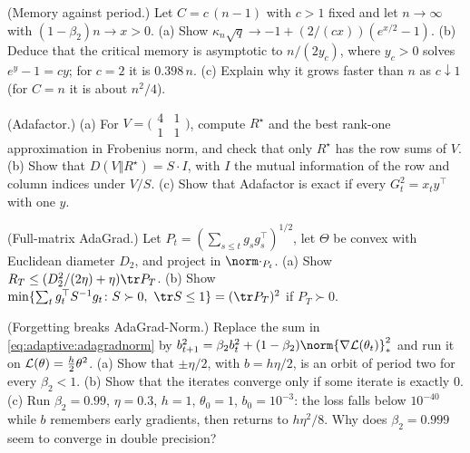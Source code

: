 \begin{refsection}
\begin{exercises}
\item \consolidation\hard (Memory against period.) Let $C=c\,(n-1)$ with $c>1$ fixed and let $n\to\infty$ with $(1-\beta_2)n\to x>0$. (a) Show $\kappa_n\sqrt q\to-1+(2/(cx))(e^{x/2}-1)$. (b) Deduce that the critical memory is asymptotic to $n/(2y_c)$, where $y_c>0$ solves $e^y-1=cy$; for $c=2$ it is $0.398\,n$. (c) Explain why it grows faster than $n$ as $c\downarrow1$ (for $C=n$ it is about $n^2/4$). \label{ex:adaptive:period}

\item \consolidation (Adafactor.) (a) For $V=\bigl(\begin{smallmatrix}4&1\\1&1\end{smallmatrix}\bigr)$, compute $R^\star$ and the best rank-one approximation in Frobenius norm, and check that only $R^\star$ has the row sums of $V$. (b) Show that $D(V\Vert R^\star)=S\cdot I$, with $I$ the mutual information of the row and column indices under $V/S$. (c) Show that Adafactor is exact if every $G_t^2=x_ty^\top$ with one $y$.\label{ex:adaptive:adafactor}

\item \variation\hard (Full-matrix AdaGrad.) Let $P_t=(\sum_{s\le t}g_sg_s^\top)^{1/2}$, let $\Theta$ be convex with Euclidean diameter $D_2$, and project in $\norm\cdot_{P_t}$. (a) Show $R_T\le(D_2^2/(2\eta)+\eta)\tr P_T$. (b) Show $\min\{\sum_tg_t^\top S^{-1}g_t\colon S\succ0,\ \tr S\le1\}=(\tr P_T)^2$ if $P_T\succ0$. \label{ex:adaptive:fullmatrix}

\item \variation (Forgetting breaks AdaGrad-Norm.) Replace the sum in \eqref{eq:adaptive:adagradnorm} by $b_{t+1}^2=\beta_2b_t^2+(1-\beta_2)\norm{\nabla\Loss(\theta_t)}_*^2$ and run it on $\mathcal{L}(\theta)=\frac h2\theta^2$. (a) Show that $\pm\eta/2$, with $b=h\eta/2$, is an orbit of period two for every $\beta_2<1$. (b) Show that the iterates converge only if some iterate is exactly $0$. (c) Run $\beta_2=0.99$, $\eta=0.3$, $h=1$, $\theta_0=1$, $b_0=10^{-3}$: the loss falls below $10^{-40}$ while $b$ remembers early gradients, then returns to $h\eta^2/8$. Why does $\beta_2=0.999$ seem to converge in double precision?\label{ex:adaptive:rmsnorm}


\end{exercises}
\end{refsection}
